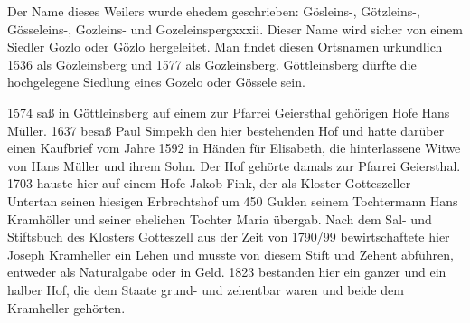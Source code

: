 \documentclass[12pt,a4pager,draft]{book}
\begin{document}
Der Name dieses Weilers wurde ehedem geschrieben: Gösleins-, Götzleins-,
Gösseleins-, Gozleins- und Gozeleinspergxxxii. Dieser Name wird sicher von einem
Siedler Gozlo oder Gözlo hergeleitet. Man findet diesen Ortsnamen urkundlich
1536 als Gözleinsberg und 1577 als Gozleinsberg. Göttleinsberg dürfte die
hochgelegene Siedlung eines Gozelo oder Gössele sein.

1574 saß in Göttleinsberg auf einem zur Pfarrei Geiersthal gehörigen Hofe Hans
Müller. 1637 besaß Paul Simpekh den hier bestehenden Hof und hatte darüber einen
Kaufbrief vom Jahre 1592 in Händen für Elisabeth, die hinterlassene Witwe von
Hans Müller und ihrem Sohn. Der Hof gehörte damals zur Pfarrei Geiersthal. 1703
hauste hier auf einem Hofe Jakob Fink, der als Kloster Gotteszeller Untertan
seinen hiesigen Erbrechtshof um 450 Gulden seinem Tochtermann Hans Kramhöller
und seiner ehelichen Tochter Maria übergab. Nach dem Sal- und Stiftsbuch des
Klosters Gotteszell aus der Zeit von 1790/99 bewirtschaftete hier Joseph
Kramheller ein Lehen und musste von diesem Stift und Zehent abführen, entweder
als Naturalgabe oder in Geld. 1823 bestanden hier ein ganzer und ein halber Hof,
die dem Staate grund- und zehentbar waren und beide dem Kramheller gehörten.
\end{document}
